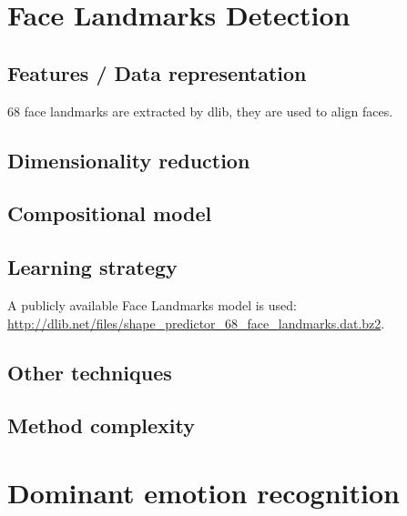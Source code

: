 \documentclass{article}
\begin{document}
\section{Face Landmarks Detection}
\subsection{Features / Data representation}

68 face landmarks are extracted by dlib, they are used to align faces.

\subsection{Dimensionality reduction}

\subsection{Compositional model}

\subsection{Learning strategy}

A publicly available Face Landmarks model is used: \url{http://dlib.net/files/shape_predictor_68_face_landmarks.dat.bz2}.

\subsection{Other techniques}

\subsection{Method complexity}


\section{Dominant emotion recognition}
\end{document}
